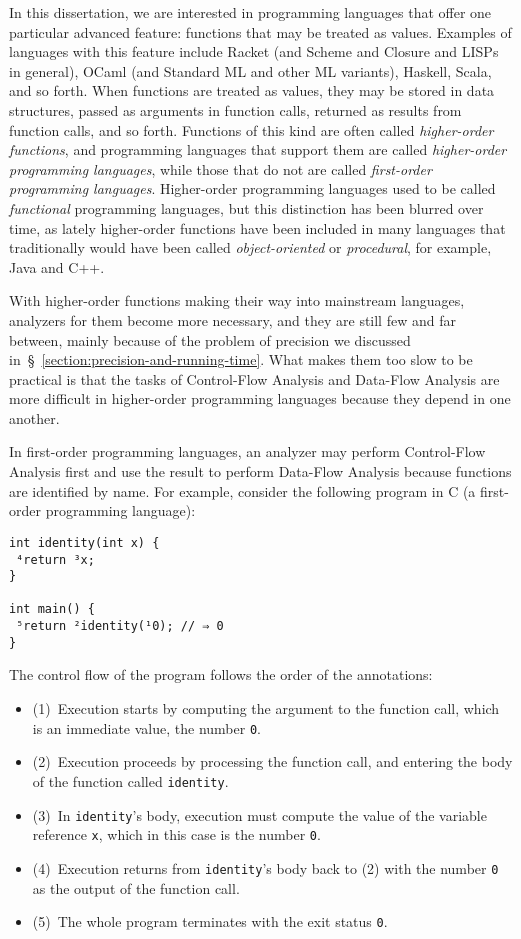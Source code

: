 \documentclass[12pt, oneside]{book}
\begin{document}
In this dissertation, we are interested in programming languages that offer one particular advanced feature: functions that may be treated as values. Examples of languages with this feature include Racket (and Scheme and Closure and LISPs in general), OCaml (and Standard ML and other ML variants), Haskell, Scala, and so forth. When functions are treated as values, they may be stored in data structures, passed as arguments in function calls, returned as results from function calls, and so forth. Functions of this kind are often called \emph{higher-order functions}, and programming languages that support them are called \emph{higher-order programming languages}, while those that do not are called \emph{first-order programming languages}. Higher-order programming languages used to be called \emph{functional} programming languages, but this distinction has been blurred over time, as lately higher-order functions have been included in many languages that traditionally would have been called \emph{object-oriented} or \emph{procedural}, for example, Java and C++.

With higher-order functions making their way into mainstream languages, analyzers for them become more necessary, and they are still few and far between, mainly because of the problem of precision we discussed in~§~\ref{section:precision-and-running-time}. What makes them too slow to be practical is that the tasks of Control-Flow Analysis and Data-Flow Analysis are more difficult in higher-order programming languages because they depend in one another.

In first-order programming languages, an analyzer may perform Control-Flow Analysis first and use the result to perform Data-Flow Analysis because functions are identified by name. For example, consider the following program in C (a first-order programming language):

\begin{Verbatim}
int identity(int x) {
 ⁴return ³x;
}

int main() {
 ⁵return ²identity(¹0); // ⇒ 0
}
\end{Verbatim}

The control flow of the program follows the order of the annotations:

\begin{itemize}
  \item (1)~Execution starts by computing the argument to the function call, which is an immediate value, the number \texttt{0}.
  \item (2)~Execution proceeds by processing the function call, and entering the body of the function called \texttt{identity}.
  \item (3)~In \texttt{identity}’s body, execution must compute the value of the variable reference \texttt{x}, which in this case is the number \texttt{0}.
  \item (4)~Execution returns from \texttt{identity}’s body back to (2) with the number \texttt{0} as the output of the function call.
  \item (5)~The whole program terminates with the exit status \texttt{0}.
\end{itemize}
\end{document}
